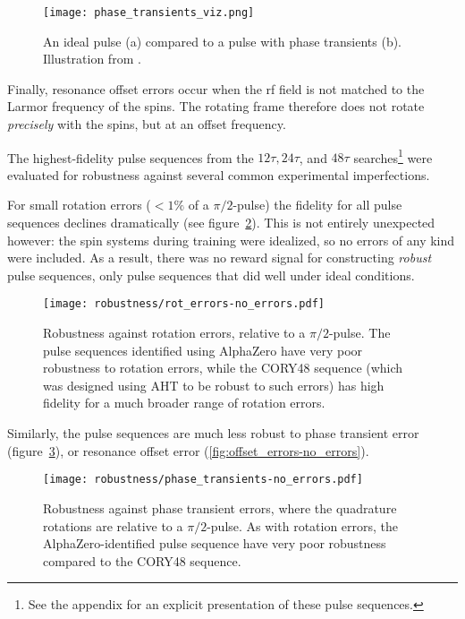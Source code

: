 \begin{figure}[H]
    \centering
    \texttt{[image: phase\_transients\_viz.png]}
    \caption{
    An ideal pulse (a) compared to a pulse with phase transients (b). Illustration from \cite{1976ii}.
    }
    \label{fig:phase_transients}
\end{figure}

Finally, resonance offset errors occur when the rf field is not matched to the Larmor frequency of the spins. The rotating frame therefore does not rotate \emph{precisely} with the spins, but at an offset frequency.

The highest-fidelity pulse sequences from the $12\tau, 24\tau$, and $48\tau$ searches\footnote{
See the appendix for an explicit presentation of these pulse sequences.
} were evaluated for robustness against several common experimental imperfections.



For small rotation errors ($<1\%$ of a $\pi/2$-pulse) the fidelity for all pulse sequences declines dramatically (see figure~\ref{fig:rot_errors-no_errors}).
This is not entirely unexpected however: the spin systems during training were idealized, so no errors of any kind were included. As a result, there was no reward signal for constructing \emph{robust} pulse sequences, only pulse sequences that did well under ideal conditions.





\begin{figure}[H]
    \centering
    \texttt{[image: robustness/rot\_errors-no\_errors.pdf]}
    \caption{Robustness against rotation errors, relative to a $\pi/2$-pulse. The pulse sequences identified using AlphaZero have very poor robustness to rotation errors, while the CORY48 sequence (which was designed using AHT to be robust to such errors) has high fidelity for a much broader range of rotation errors.
    }
    \label{fig:rot_errors-no_errors}
\end{figure}

Similarly, the pulse sequences are much less robust to phase transient error (figure~\ref{fig:phase_transients-no_errors}), or
resonance offset error (\ref{fig:offset_errors-no_errors}).


\begin{figure}[H]
    \centering
    \texttt{[image: robustness/phase\_transients-no\_errors.pdf]}
    \caption{Robustness against phase transient errors, where the quadrature rotations are relative to a $\pi/2$-pulse. As with rotation errors, the AlphaZero-identified pulse sequence have very poor robustness compared to the CORY48 sequence.
    }
    \label{fig:phase_transients-no_errors}
\end{figure}


